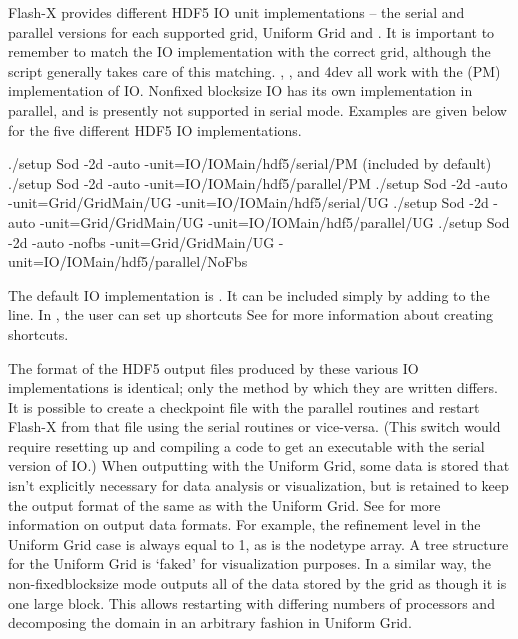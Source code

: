 Flash-X provides different HDF5 IO unit implementations -- the serial
and parallel versions for each supported grid, Uniform Grid and
\Paramesh. It is important to remember to match the IO
implementation with the correct grid, although the  script generally
takes care of this matching.   , , and \Paramesh4dev all work
with the \Paramesh (PM) implementation of IO.  Nonfixed blocksize IO has 
its own implementation in parallel, and is presently not supported in serial
mode.
Examples are given below for the five different HDF5 IO implementations.

\begin{codeseg}
./setup Sod -2d -auto -unit=IO/IOMain/hdf5/serial/PM (included by default)
./setup Sod -2d -auto -unit=IO/IOMain/hdf5/parallel/PM
./setup Sod -2d -auto -unit=Grid/GridMain/UG -unit=IO/IOMain/hdf5/serial/UG
./setup Sod -2d -auto -unit=Grid/GridMain/UG -unit=IO/IOMain/hdf5/parallel/UG
./setup Sod -2d -auto -nofbs -unit=Grid/GridMain/UG -unit=IO/IOMain/hdf5/parallel/NoFbs
\end{codeseg}

The default IO implementation is .
It can be included simply by adding  to the 
line.  In \flashx, the user can set up
shortcuts%
See
 for
more information about creating shortcuts.


The format of the HDF5 output files produced by these various IO
implementations is identical; only the method by which they are
written differs.  It is possible to create a checkpoint file with the
parallel routines and restart Flash-X from that file using the serial
routines or vice-versa.  (This switch would require resetting up and compiling a code to
get an executable with the serial version of IO.)
When outputting with the Uniform Grid, some
data is stored that isn't explicitly necessary for data analysis or
visualization, but is retained to keep the output format of \Paramesh
the same as with the Uniform Grid.  See  for
more information on output data formats.  For example, the refinement
level in the Uniform Grid case is always equal to 1, as is the
nodetype array.  A tree structure for the Uniform Grid is `faked' for visualization purposes.
In a similar way, the non-fixedblocksize mode outputs all of the data stored by the grid as 
though it is one large block.  This allows restarting with differing numbers of processors
and decomposing the domain in an arbitrary fashion in Uniform Grid.

